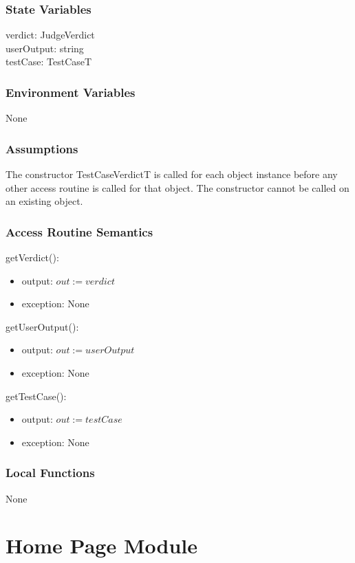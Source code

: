 \documentclass[12pt, titlepage]{article}
\begin{document}
\subsubsection{State Variables}

verdict: JudgeVerdict \\
userOutput: string \\
testCase: TestCaseT

\subsubsection{Environment Variables}

None

\subsubsection{Assumptions}

The constructor TestCaseVerdictT is called for each object instance before any other access routine is called for that object. The constructor cannot be called on an existing object.


\subsubsection{Access Routine Semantics}

\noindent getVerdict():
\begin{itemize}
\item output: $out := verdict$
\item exception: None
\end{itemize}

\noindent getUserOutput():
\begin{itemize}
\item output: $out := userOutput$
\item exception: None
\end{itemize}

\noindent getTestCase():
\begin{itemize}
\item output: $out := testCase$
\item exception: None
\end{itemize}

\subsubsection{Local Functions}
None
\newpage

\section{Home Page Module} \label{HomePage} 
\end{document}
